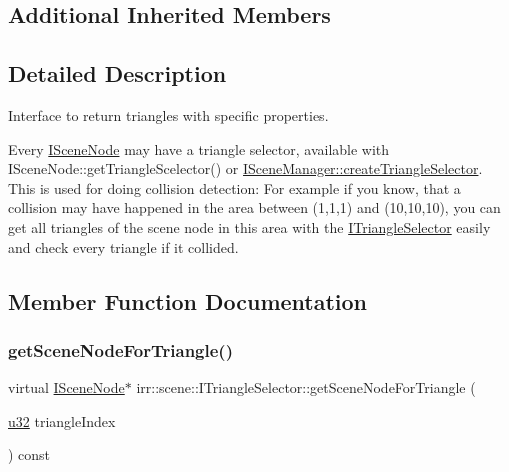 \subsection*{Additional Inherited Members}


\subsection{Detailed Description}
Interface to return triangles with specific properties. 

Every \hyperlink{classirr_1_1scene_1_1ISceneNode}{I\+Scene\+Node} may have a triangle selector, available with I\+Scene\+Node\+::get\+Triangle\+Scelector() or \hyperlink{classirr_1_1scene_1_1ISceneManager_a266625379b1558e9be1dc062ea4e71f7}{I\+Scene\+Manager\+::create\+Triangle\+Selector}. This is used for doing collision detection\+: For example if you know, that a collision may have happened in the area between (1,1,1) and (10,10,10), you can get all triangles of the scene node in this area with the \hyperlink{classirr_1_1scene_1_1ITriangleSelector}{I\+Triangle\+Selector} easily and check every triangle if it collided. 

\subsection{Member Function Documentation}
\mbox{\label{classirr_1_1scene_1_1ITriangleSelector_a9b180f4d9e273a6c1cda9afeb3b1c98b}} 
\subsubsection{\texorpdfstring{get\+Scene\+Node\+For\+Triangle()}{getSceneNodeForTriangle()}\hspace{0.1cm}{\footnotesize\ttfamily [1/2]}}
{\footnotesize\ttfamily virtual \hyperlink{classirr_1_1scene_1_1ISceneNode}{I\+Scene\+Node}$\ast$ irr\+::scene\+::\+I\+Triangle\+Selector\+::get\+Scene\+Node\+For\+Triangle (\begin{DoxyParamCaption}\item[{\hyperlink{namespaceirr_a0416a53257075833e7002efd0a18e804}{u32}}]{triangle\+Index }\end{DoxyParamCaption}) const\hspace{0.3cm}{\ttfamily [pure virtual]}}



